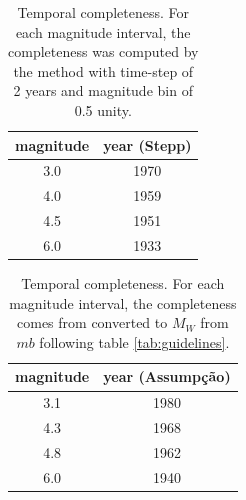 \documentclass[draft, grl]{agutex}
\begin{document}
\begin{table}[H]
	\caption{Temporal completeness. For each magnitude interval, the completeness was computed by the \citet{stepp_1972} method with time-step of 2 years and magnitude bin of 0.5 unity.}
	\begin{tabular}{c c }
		\hline
	\textbf{magnitude} & \textbf{year (Stepp)} \\
		\hline
		3.0 & 1970 \\
		4.0 & 1959 \\
		4.5 & 1951 \\
		6.0 & 1933 \\
		\hline
	\end{tabular}
	\label{tab:completeness_stepp}
\end{table}

\begin{table}[H]
	\caption{Temporal completeness. For each magnitude interval, the completeness comes from \citet{assumpcao_et_al_2014} converted to $M_W$ from $mb$ following table \ref{tab:guidelines}.}
	\begin{tabular}{c c}
		\hline
	\textbf{magnitude} & \textbf{year (Assumpção)} \\
		\hline
		3.1 & 1980 \\
		4.3 & 1968 \\
		4.8 & 1962 \\
		6.0 & 1940 \\
		\hline
	\end{tabular}
	\label{tab:completeness}
\end{table}
\end{document}

